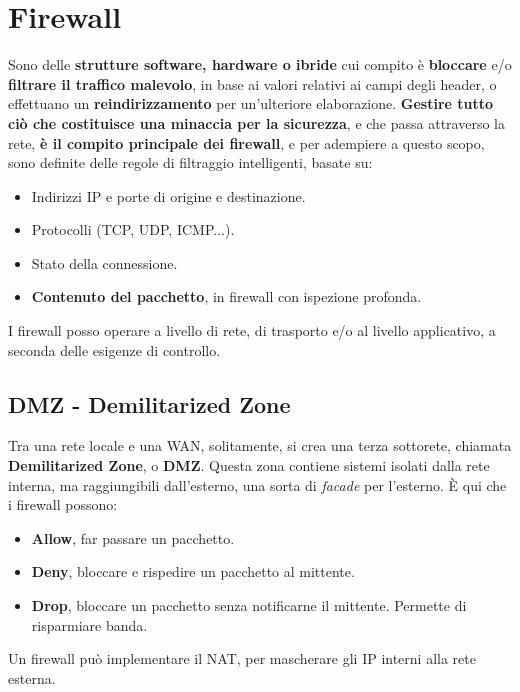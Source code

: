 \section{Firewall}
Sono delle\textbf{ strutture software, hardware o ibride} cui compito è \textbf{bloccare} e/o \textbf{filtrare il traffico malevolo}, in base ai valori relativi ai campi degli header, o effettuano un \textbf{reindirizzamento} per un'ulteriore elaborazione. \textbf{Gestire tutto ciò che costituisce una minaccia per la sicurezza}, e che passa attraverso la rete,\textbf{ è il compito principale dei firewall}, e per adempiere a questo scopo, sono definite delle regole di filtraggio intelligenti, basate su:
\begin{itemize}
	\item Indirizzi IP e porte di origine e destinazione.
	\item Protocolli (TCP, UDP, ICMP...).
	\item Stato della connessione.
	\item \textbf{Contenuto del pacchetto}, in firewall con ispezione profonda.
\end{itemize}

I firewall posso operare a livello di rete, di trasporto e/o al livello applicativo, a seconda delle esigenze di controllo.

\subsection{DMZ - Demilitarized Zone}
Tra una rete locale e una WAN, solitamente, si crea una terza sottorete, chiamata \textbf{Demilitarized Zone}, o \textbf{DMZ}. Questa zona contiene sistemi isolati dalla rete interna, ma raggiungibili dall'esterno, una sorta di \textit{facade} per l'esterno. È qui che i firewall possono:

\begin{itemize}
	\item \textbf{Allow}, far passare un pacchetto.
	\item \textbf{Deny}, bloccare e rispedire un pacchetto al mittente.
	\item \textbf{Drop}, bloccare un pacchetto senza notificarne il mittente. Permette di risparmiare banda. 
\end{itemize}

Un firewall può implementare il NAT, per mascherare gli IP interni alla rete esterna. 
